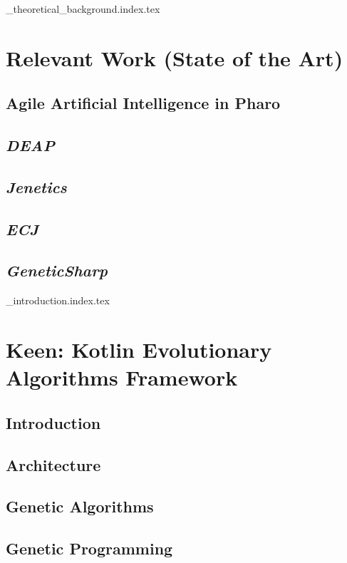 {_theoretical_background.index.tex}

\chapter{Relevant Work (State of the Art)}
\label{chap:relevant_and_related_work}
  \section{Agile Artificial Intelligence in Pharo}
  \label{sec:agile_artificial_intelligence_in_pharo}
    \Blindtext
  \section{\textit{DEAP}}
  \label{sec:deap}
    \Blindtext
  \section{\textit{Jenetics}}
  \label{sec:jenetics}
    \Blindtext
  \section{\textit{ECJ}}
  \label{sec:ecj}
    \Blindtext
  \section{\textit{GeneticSharp}}
  \label{sec:geneticsharp}
    \Blindtext

{_introduction.index.tex}

\chapter{Keen: Kotlin Evolutionary Algorithms Framework}
\label{chap:keen}
  \section{Introduction}
  \label{sec:introduction}
    \Blindtext
  \section{Architecture}
  \label{sec:architecture}
    \Blindtext
  \section{Genetic Algorithms}
  \label{sec:genetic_algorithms}
    \Blindtext
  \section{Genetic Programming}
  \label{sec:genetic_programming}
    \Blindtext
